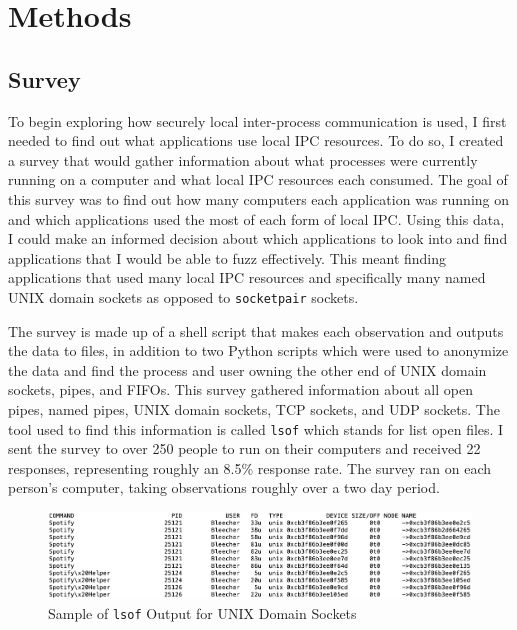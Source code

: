 \chapter{Methods}
\label{sec:methods}

\section{Survey}
\label{sec:survey}
To begin exploring how securely local inter-process communication is used, I first needed to find out what applications use local IPC resources.  To do so, I created a survey that would gather information about what processes were currently running on a computer and what local IPC resources each consumed.  The goal of this survey was to find out how many computers each application was running on and which applications used the most of each form of local IPC.  Using this data, I could make an informed decision about which applications to look into and find applications that I would be able to fuzz effectively.  This meant finding applications that used many local IPC resources and specifically many named UNIX domain sockets as opposed to \texttt{socketpair} sockets.

The survey is made up of a shell script that makes each observation and outputs the data to files, in addition to two Python scripts which were used to anonymize the data and find the process and user owning the other end of UNIX domain sockets, pipes, and FIFOs.  This survey gathered information about all open pipes, named pipes, UNIX domain sockets, TCP sockets, and UDP sockets.  The tool used to find this information is called \texttt{lsof} which stands for list open files.  I sent the survey to over 250 people to run on their computers and received 22 responses, representing roughly an 8.5\% response rate.  The survey ran on each person's computer, taking observations roughly over a two day period.  

\begin{figure}
\centering
\includegraphics[width=1\textwidth]{lsofOutput.png}
\caption{Sample of \texttt{lsof} Output for UNIX Domain Sockets}
\label{fig:lsofOutput}
\end{figure}

